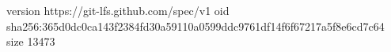 version https://git-lfs.github.com/spec/v1
oid sha256:365d0dc0ca143f2384fd30a59110a0599ddc9761df14f6f67217a5f8e6cd7c64
size 13473
